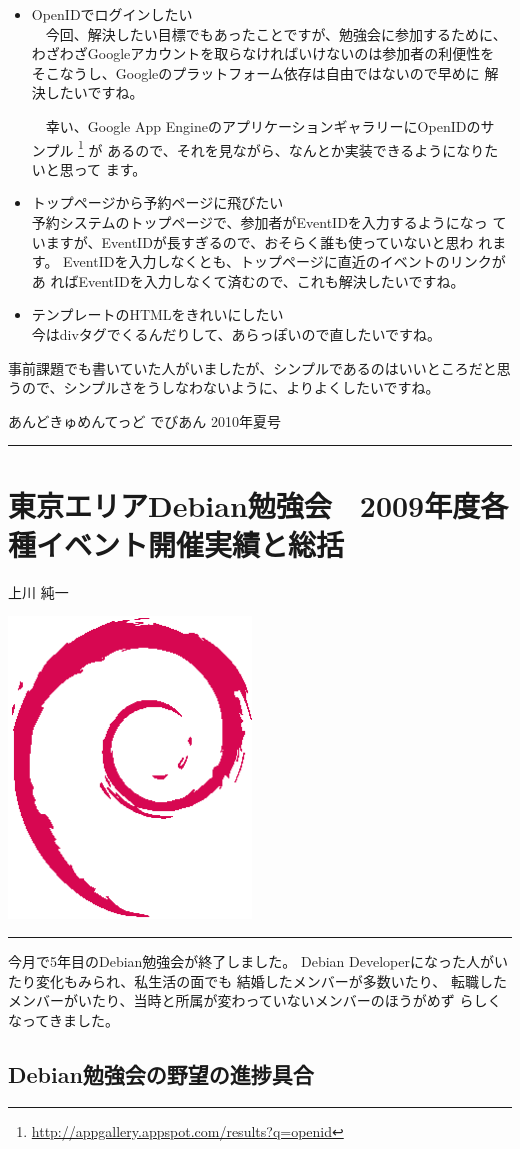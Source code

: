 \documentclass[mingoth,a4paper]{jsarticle}
\renewcommand{\dancersection}[2]{%
\newpage
あんどきゅめんてっど でびあん 2010年夏号
%
\vspace{0.1mm}\\
{\color{dancerlightblue}\rule{\hsize}{2mm}}

%
%
\begin{minipage}[t]{0.6\hsize}
\color{dancerdarkblue}
\vspace{1cm}
\section{#1}
\hfill{}#2\\
\end{minipage}
\begin{minipage}[t]{0.4\hsize}
\vspace{-2cm}
\hfill{}\includegraphics[height=8cm]{image200502/openlogo-nd.eps}\\
\vspace{-5cm}
\end{minipage}
%
%
{\color{dancerdarkblue}\rule{0.74\hsize}{2mm}}
%
\vspace{2cm}
}
\begin{document}
\begin{itemize}
 \item OpenIDでログインしたい \\
       　今回、解決したい目標でもあったことですが、勉強会に参加するために、
       わざわざGoogleアカウントを取らなければいけないのは参加者の利便性を
       そこなうし、Googleのプラットフォーム依存は自由ではないので早めに
       解決したいですね。
       
       　幸い、Google App EngineのアプリケーションギャラリーにOpenIDのサ
       ンプル
       \footnote{\url{http://appgallery.appspot.com/results?q=openid}} が
       あるので、それを見ながら、なんとか実装できるようになりたいと思って
       ます。\\

 \item トップページから予約ページに飛びたい \\
       予約システムのトップページで、参加者がEventIDを入力するようになっ
       ていますが、EventIDが長すぎるので、おそらく誰も使っていないと思わ
       れます。
       EventIDを入力しなくとも、トップページに直近のイベントのリンクがあ
       ればEventIDを入力しなくて済むので、これも解決したいですね。\\

 \item テンプレートのHTMLをきれいにしたい \\
       今はdivタグでくるんだりして、あらっぽいので直したいですね。
\end{itemize}

事前課題でも書いていた人がいましたが、シンプルであるのはいいところだと思
うので、シンプルさをうしなわないように、よりよくしたいですね。

\clearpage

\dancersection{東京エリアDebian勉強会　2009年度各種イベント開催実績と総括}{上川 純一}
\label{sec:debmtg2009results}

今月で5年目のDebian勉強会が終了しました。
Debian Developerになった人がいたり変化もみられ、私生活の面でも
結婚したメンバーが多数いたり、
転職したメンバーがいたり、当時と所属が変わっていないメンバーのほうがめず
らしくなってきました。

\subsection{Debian勉強会の野望の進捗具合}
\end{document}
